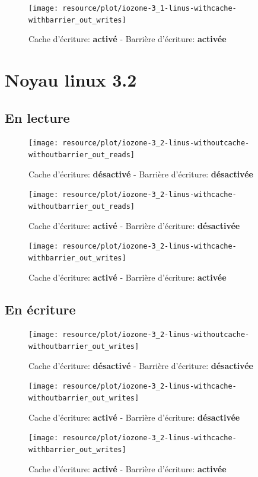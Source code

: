 \begin{figure}[H]
	\centering
	\texttt{[image: resource/plot/iozone-3\_1-linus-withcache-withbarrier\_out\_writes]}
	\caption{Cache d'écriture: \textbf{activé}   -   Barrière d'écriture: \textbf{activée}}
\end{figure}

\section{Noyau linux 3.2}

\subsection*{En lecture}

\begin{figure}[H]
	\centering
	\texttt{[image: resource/plot/iozone-3\_2-linus-withoutcache-withoutbarrier\_out\_reads]}
	\caption{Cache d'écriture: \textbf{désactivé}   -   Barrière d'écriture: \textbf{désactivée}}
\end{figure}

\begin{figure}[H]
	\centering
	\texttt{[image: resource/plot/iozone-3\_2-linus-withcache-withoutbarrier\_out\_reads]}
	\caption{Cache d'écriture: \textbf{activé}   -   Barrière d'écriture: \textbf{désactivée}}
\end{figure}

\begin{figure}[H]
	\centering
	\texttt{[image: resource/plot/iozone-3\_2-linus-withcache-withbarrier\_out\_writes]}
	\caption{Cache d'écriture: \textbf{activé}   -   Barrière d'écriture: \textbf{activée}}
\end{figure}

\subsection*{En écriture}

\begin{figure}[H]
	\centering
	\texttt{[image: resource/plot/iozone-3\_2-linus-withoutcache-withoutbarrier\_out\_writes]}
	\caption{Cache d'écriture: \textbf{désactivé}   -   Barrière d'écriture: \textbf{désactivée}}
\end{figure}

\begin{figure}[H]
	\centering
	\texttt{[image: resource/plot/iozone-3\_2-linus-withcache-withoutbarrier\_out\_writes]}
	\caption{Cache d'écriture: \textbf{activé}   -   Barrière d'écriture: \textbf{désactivée}}
\end{figure}

\begin{figure}[H]
	\centering
	\texttt{[image: resource/plot/iozone-3\_2-linus-withcache-withbarrier\_out\_writes]}
	\caption{Cache d'écriture: \textbf{activé}   -   Barrière d'écriture: \textbf{activée}}
\end{figure}
